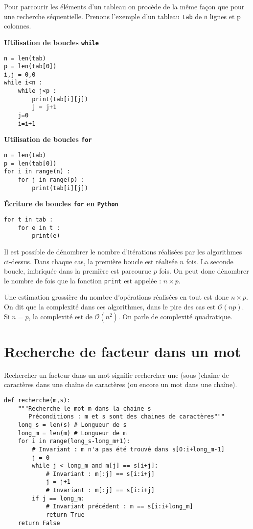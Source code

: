 Pour parcourir les éléments d'un tableau on procède de la même façon que pour une recherche séquentielle. Prenons l'exemple d'un tableau \texttt{tab} de \texttt{n} lignes et {p} colonnes.

\textbf{Utilisation de boucles \texttt{while}}
\begin{lstlisting}
n = len(tab)
p = len(tab[0])
i,j = 0,0
while i<n :
    while j<p :
        print(tab[i][j])
        j = j+1
    j=0
    i=i+1
\end{lstlisting}

\textbf{Utilisation de boucles \texttt{for}}
\begin{lstlisting}
n = len(tab)
p = len(tab[0])
for i in range(n) :
    for j in range(p) :
        print(tab[i][j])
\end{lstlisting}

\textbf{Écriture de boucles \texttt{for} en \texttt{Python}}
\begin{lstlisting}
for t in tab :
    for e in t :
        print(e)
\end{lstlisting}

\begin{rem}
Il est possible de dénombrer le nombre d'itérations réalisées par les algorithmes ci-dessus. Dans chaque cas, la première boucle est réalisée $n$ fois. La seconde boucle, imbriquée dans la première est parcourue $p$ fois. 
On peut donc dénombrer le nombre de fois que la fonction \texttt{print} est appelée : $n\times p$. 

Une estimation grossière du nombre d'opérations réalisées en tout est donc  $n\times p$. On dit que la complexité dans ces algorithmes, dans le pire des cas est $\mathcal{O}\left(np\right)$. Si $n=p$, la complexité est de $\mathcal{O}\left(n^2\right)$. On parle de complexité quadratique. 

\end{rem}
 

\section{Recherche de facteur dans un mot}
Rechercher un facteur dans un mot signifie rechercher une (sous-)chaîne de caractères dans une chaîne de caractères (ou encore un mot dans une chaîne).
\begin{lstlisting}
def recherche(m,s):
    """Recherche le mot m dans la chaine s
       Préconditions : m et s sont des chaines de caractères"""
    long_s = len(s) # Longueur de s
    long_m = len(m) # Longueur de m
    for i in range(long_s-long_m+1): 
        # Invariant : m n'a pas été trouvé dans s[0:i+long_m-1]
        j = 0
        while j < long_m and m[j] == s[i+j]:
            # Invariant : m[:j] == s[i:i+j]
            j = j+1
            # Invariant : m[:j] == s[i:i+j]
        if j == long_m:
            # Invariant précédent : m == s[i:i+long_m]
            return True
    return False
\end{lstlisting}

